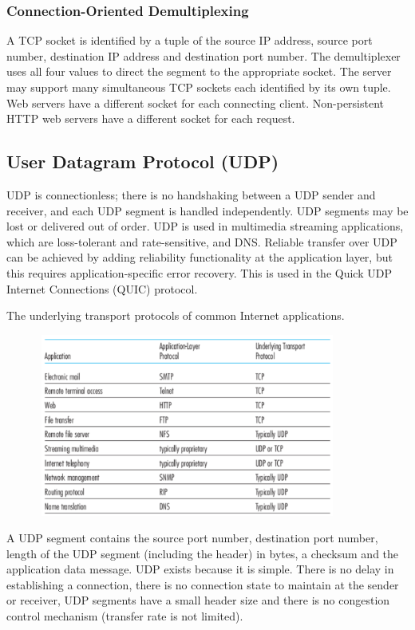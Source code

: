\subsubsection{Connection-Oriented Demultiplexing}

A TCP socket is identified by a tuple of the source IP address, source port number, destination IP address and destination port number.
The demultiplexer uses all four values to direct the segment to the appropriate socket.
The server may support many simultaneous TCP sockets each identified by its own tuple.
Web servers have a different socket for each connecting client.
Non-persistent HTTP web servers have a different socket for each request.

\subsection{User Datagram Protocol (UDP)}

UDP is connectionless; there is no handshaking between a UDP sender and receiver, and each UDP segment is handled independently.
UDP segments may be lost or delivered out of order.
UDP is used in multimedia streaming applications, which are loss-tolerant and rate-sensitive, and DNS\@.
Reliable transfer over UDP can be achieved by adding reliability functionality at the application layer, but this requires application-specific error recovery.
This is used in the Quick UDP Internet Connections (QUIC) protocol.

\begin{table}[htp]
  \centering
  \caption*{The underlying transport protocols of common Internet applications.}
  \includegraphics[width=12cm,height=6cm]{unit-18/figures/common-transport-protocols.png}
\end{table}

A UDP segment contains the source port number, destination port number, length of the UDP segment (including the header) in bytes, a checksum and the application data message.
UDP exists because it is simple.
There is no delay in establishing a connection, there is no connection state to maintain at the sender or receiver, UDP segments have a small header size and there is no congestion control mechanism (transfer rate is not limited).

